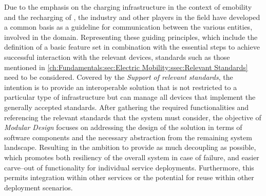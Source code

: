 Due to the emphasis on the charging infrastructure in the context of \acrshort{emobility} and the recharging of , the industry and other players in the field have developed a common basis as a guideline for communication between the various entities, involved in the domain.
Representing these guiding principles, which include the definition of a basic feature set in combination with the essential steps to achieve successful interaction with the relevant devices, standards such as those mentioned in \ref{ch:Fundamentals:sec:Electric Mobility:ssec:Relevant Standards} need to be considered.
Covered by the \textit{Support of relevant standards}, the intention is to provide an interoperable solution that is not restricted to a particular type of infrastructure but can manage all devices that implement the generally accepted standards.
After gathering the required functionalities and referencing the relevant standards that the system must consider, the objective of \textit{Modular Design} focuses on addressing the design of the solution in terms of software components and the necessary abstraction from the remaining system landscape.
Resulting in the ambition to provide as much decoupling as possible, which promotes both resiliency of the overall system in case of failure, and easier carve--out of functionality for individual service deployments. Furthermore, this permits integration within other services or the potential for reuse within other deployment scenarios. \\

